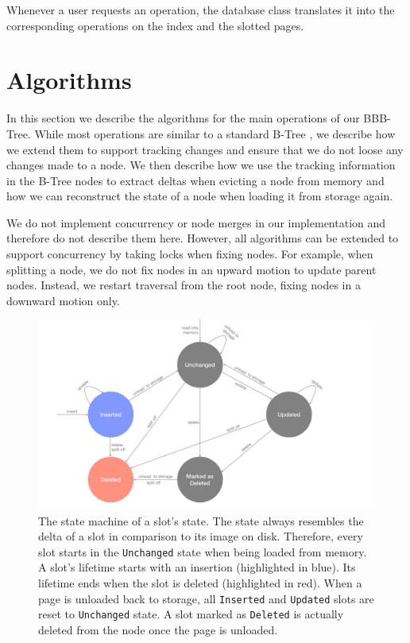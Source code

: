 Whenever a user requests an operation, the database class translates it into the corresponding operations on the index and the slotted pages.

\section{Algorithms}
\label{sec:algorithms}
In this section we describe the algorithms for the main operations of our BBB-Tree.
While most operations are similar to a standard B-Tree \cite{mdbs2024slides}, we describe how we extend them to support tracking changes and ensure that we do not loose any changes made to a node.
We then describe how we use the tracking information in the B-Tree nodes to extract deltas when evicting a node from memory and how we can reconstruct the state of a node when loading it from storage again.

We do not implement concurrency or node merges in our implementation and therefore do not describe them here.
However, all algorithms can be extended to support concurrency by taking locks when fixing nodes.
For example, when splitting a node, we do not fix nodes in an upward motion to update parent nodes.
Instead, we restart traversal from the root node, fixing nodes in a downward motion only.

\begin{figure}[htbp]
  \centering
  \includegraphics[width=1\textwidth]{figures/slot_states.pdf}
  \caption{The state machine of a slot's state. The state always resembles the delta of a slot in comparison to its image on disk. Therefore, every slot starts in the \texttt{Unchanged} state when being loaded from memory. A slot's lifetime starts with an insertion (highlighted in blue). Its lifetime ends when the slot is deleted (highlighted in red). When a page is unloaded back to storage, all \texttt{Inserted} and \texttt{Updated} slots are reset to \texttt{Unchanged} state. A slot marked as \texttt{Deleted} is actually deleted from the node once the page is unloaded.}
  \label{fig:slot-states}
\end{figure}

